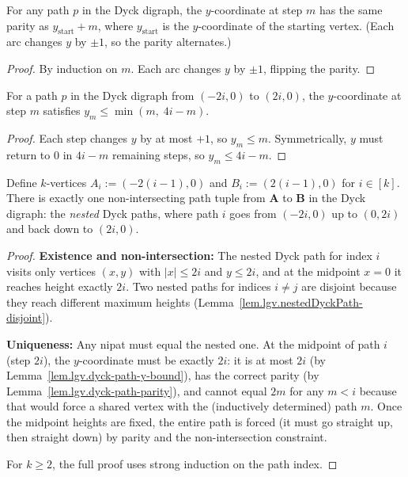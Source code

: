 \begin{lemma}
\label{lem.lgv.dyck-path-parity}
For any path $p$ in the Dyck digraph, the $y$-coordinate at step $m$
has the same parity as $y_{\mathrm{start}} + m$, where $y_{\mathrm{start}}$ is the
$y$-coordinate of the starting vertex.  (Each arc changes $y$
by $\pm 1$, so the parity alternates.)
\end{lemma}

\begin{proof}
By induction on $m$.  Each arc changes $y$ by $\pm 1$, flipping
the parity.
\end{proof}

\begin{lemma}
\label{lem.lgv.dyck-path-y-bound}
For a path $p$ in the Dyck digraph from $(-2i, 0)$ to $(2i, 0)$,
the $y$-coordinate at step $m$ satisfies
$y_m \le \min(m,\; 4i - m)$.
\end{lemma}

\begin{proof}
Each step changes $y$ by at most $+1$, so $y_m \le m$.
Symmetrically, $y$ must return to $0$ in $4i - m$ remaining steps,
so $y_m \le 4i - m$.
\end{proof}

\begin{lemma}
\label{lem.lgv.catalan-unique-nipat}
\leanhelper
\leanok
Define $k$-vertices
$A_i := (-2(i-1), 0)$ and $B_i := (2(i-1), 0)$ for $i \in [k]$.
There is exactly one non-intersecting path tuple from $\mathbf{A}$ to
$\mathbf{B}$ in the Dyck digraph: the \emph{nested} Dyck paths, where
path $i$ goes from $(-2i, 0)$ up to $(0, 2i)$ and back down to $(2i, 0)$.
\end{lemma}

\begin{proof}
\textbf{Existence and non-intersection:}
The nested Dyck path for index $i$ visits only vertices $(x, y)$
with $|x| \le 2i$ and $y \le 2i$, and at the midpoint $x = 0$ it
reaches height exactly $2i$.  Two nested paths for indices $i \ne j$
are disjoint because they reach different maximum heights
(Lemma~\ref{lem.lgv.nestedDyckPath-disjoint}).

\textbf{Uniqueness:}
Any nipat must equal the nested one.  At the midpoint of path $i$
(step $2i$), the $y$-coordinate must be exactly $2i$: it is at most
$2i$ (by Lemma~\ref{lem.lgv.dyck-path-y-bound}), has the correct
parity (by Lemma~\ref{lem.lgv.dyck-path-parity}), and cannot equal
$2m$ for any $m < i$ because
that would force a shared vertex with the (inductively determined)
path $m$.  Once the midpoint heights are fixed, the entire path is
forced (it must go straight up, then straight down) by parity and the
non-intersection constraint.

For $k \ge 2$, the full proof uses strong induction on the path index.
\end{proof}

